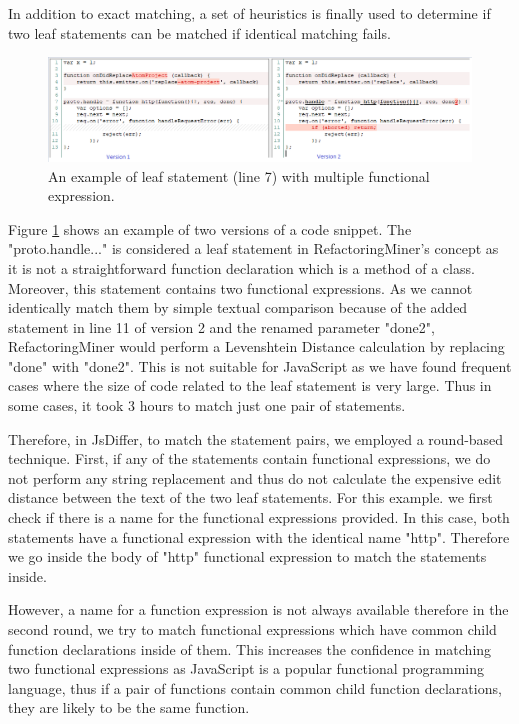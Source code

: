 \documentclass[letterpaper,12pt,onecolumn,final]{report}
\begin{document}
In addition to exact matching, a set of heuristics is finally used to determine if two leaf statements can be matched if identical matching fails.

\begin{figure}
\includegraphics[width=\textwidth,height=\textheight,keepaspectratio]{images/leaf_matching.PNG}
  \caption{An example of leaf statement (line 7) with multiple functional expression.}
   \label{fig:leafMatching}
\end{figure} 


Figure \ref{fig:leafMatching} shows an example of two versions of a code snippet. The "proto.handle..." is considered a leaf statement in RefactoringMiner's concept as it is not a straightforward function declaration which is a method of a class. Moreover, this statement contains two functional expressions. As we cannot identically match them by simple textual comparison because of the added statement in line 11 of version 2 and the renamed parameter "done2", RefactoringMiner would perform a Levenshtein Distance calculation by replacing "done" with "done2". This is not suitable for JavaScript as we have found frequent cases where the size of code related to the leaf statement is very large. Thus in some cases, it took 3 hours to match just one pair of statements.

Therefore, in JsDiffer, to match the statement pairs, we employed a round-based technique. First, if any of the statements contain functional expressions, we do not perform any string replacement and thus do not calculate the expensive edit distance between the text of the two leaf statements. For this example. we first check if there is a name for the functional expressions provided. In this case, both statements have a functional expression with the identical name "http". Therefore we go inside the body of "http" functional expression to match the statements inside. 

However, a name for a function expression is not always available therefore in the second round, we try to match functional expressions which have common child function declarations inside of them. This increases the confidence in matching two functional expressions as JavaScript is a popular functional programming language, thus if a pair of functions contain common child function declarations, they are likely to be the same function.
\end{document}

